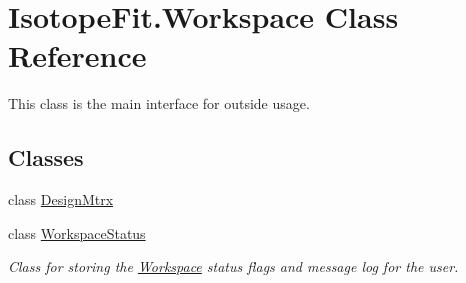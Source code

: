 \hypertarget{class_isotope_fit_1_1_workspace}{}\section{Isotope\+Fit.\+Workspace Class Reference}
\label{class_isotope_fit_1_1_workspace}


This class is the main interface for outside usage.  


\subsection*{Classes}
\begin{DoxyCompactItemize}
\item 
class \mbox{\hyperlink{class_isotope_fit_1_1_workspace_1_1_design_mtrx}{Design\+Mtrx}}
\item 
class \mbox{\hyperlink{class_isotope_fit_1_1_workspace_1_1_workspace_status}{Workspace\+Status}}
\begin{DoxyCompactList}\small\item\em Class for storing the \mbox{\hyperlink{class_isotope_fit_1_1_workspace}{Workspace}} status flags and message log for the user. \end{DoxyCompactList}\end{DoxyCompactItemize}
